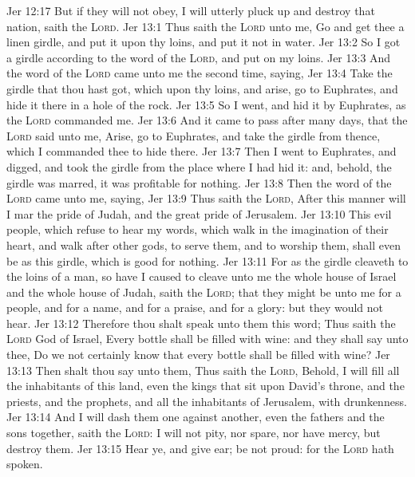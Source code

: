 \vs Jer 12:17 But if they will not obey, I will utterly pluck up and destroy that nation, saith the \textsc{Lord}.
\vs Jer 13:1 Thus saith the \textsc{Lord} unto me, Go and get thee a linen girdle, and put it upon thy loins, and put it not in water.
\vs Jer 13:2 So I got a girdle according to the word of the \textsc{Lord}, and put  on my loins.
\vs Jer 13:3 And the word of the \textsc{Lord} came unto me the second time, saying,
\vs Jer 13:4 Take the girdle that thou hast got, which  upon thy loins, and arise, go to Euphrates, and hide it there in a hole of the rock.
\vs Jer 13:5 So I went, and hid it by Euphrates, as the \textsc{Lord} commanded me.
\vs Jer 13:6 And it came to pass after many days, that the \textsc{Lord} said unto me, Arise, go to Euphrates, and take the girdle from thence, which I commanded thee to hide there.
\vs Jer 13:7 Then I went to Euphrates, and digged, and took the girdle from the place where I had hid it: and, behold, the girdle was marred, it was profitable for nothing.
\vs Jer 13:8 Then the word of the \textsc{Lord} came unto me, saying,
\vs Jer 13:9 Thus saith the \textsc{Lord}, After this manner will I mar the pride of Judah, and the great pride of Jerusalem.
\vs Jer 13:10 This evil people, which refuse to hear my words, which walk in the imagination of their heart, and walk after other gods, to serve them, and to worship them, shall even be as this girdle, which is good for nothing.
\vs Jer 13:11 For as the girdle cleaveth to the loins of a man, so have I caused to cleave unto me the whole house of Israel and the whole house of Judah, saith the \textsc{Lord}; that they might be unto me for a people, and for a name, and for a praise, and for a glory: but they would not hear.
\vs Jer 13:12 Therefore thou shalt speak unto them this word; Thus saith the \textsc{Lord} God of Israel, Every bottle shall be filled with wine: and they shall say unto thee, Do we not certainly know that every bottle shall be filled with wine?
\vs Jer 13:13 Then shalt thou say unto them, Thus saith the \textsc{Lord}, Behold, I will fill all the inhabitants of this land, even the kings that sit upon David's throne, and the priests, and the prophets, and all the inhabitants of Jerusalem, with drunkenness.
\vs Jer 13:14 And I will dash them one against another, even the fathers and the sons together, saith the \textsc{Lord}: I will not pity, nor spare, nor have mercy, but destroy them.
\vs Jer 13:15 Hear ye, and give ear; be not proud: for the \textsc{Lord} hath spoken.
